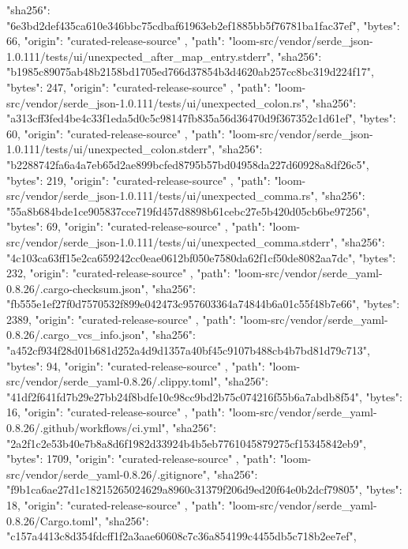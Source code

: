 {{      "sha256": "6e3bd2def435ca610e346bbc75cdbaf61963eb2ef1885bb5f76781ba1fac37ef",
      "bytes": 66,
      "origin": "curated-release-source"
    },
    {
      "path": "loom-src/vendor/serde_json-1.0.111/tests/ui/unexpected_after_map_entry.stderr",
      "sha256": "b1985c89075ab48b2158bd1705ed766d37854b3d4620ab257cc8bc319d224f17",
      "bytes": 247,
      "origin": "curated-release-source"
    },
    {
      "path": "loom-src/vendor/serde_json-1.0.111/tests/ui/unexpected_colon.rs",
      "sha256": "a313cff3fed4be4c33f1eda5d0c5c98147fb835a56d36470d9f367352c1d61ef",
      "bytes": 60,
      "origin": "curated-release-source"
    },
    {
      "path": "loom-src/vendor/serde_json-1.0.111/tests/ui/unexpected_colon.stderr",
      "sha256": "b2288742fa6a4a7eb65d2ae899bcfed8795b57bd04958da227d60928a8df26c5",
      "bytes": 219,
      "origin": "curated-release-source"
    },
    {
      "path": "loom-src/vendor/serde_json-1.0.111/tests/ui/unexpected_comma.rs",
      "sha256": "55a8b684bde1ce905837cce719fd457d8898b61cebc27e5b420d05cb6be97256",
      "bytes": 69,
      "origin": "curated-release-source"
    },
    {
      "path": "loom-src/vendor/serde_json-1.0.111/tests/ui/unexpected_comma.stderr",
      "sha256": "4c103ca63ff15e2ca659242cc0eae0612bf050e7580da62f1cf50de8082aa7dc",
      "bytes": 232,
      "origin": "curated-release-source"
    },
    {
      "path": "loom-src/vendor/serde_yaml-0.8.26/.cargo-checksum.json",
      "sha256": "fb555e1ef27f0d7570532f899e042473c957603364a74844b6a01c55f48b7e66",
      "bytes": 2389,
      "origin": "curated-release-source"
    },
    {
      "path": "loom-src/vendor/serde_yaml-0.8.26/.cargo_vcs_info.json",
      "sha256": "a452cf934f28d01b681d252a4d9d1357a40bf45c9107b488cb4b7bd81d79c713",
      "bytes": 94,
      "origin": "curated-release-source"
    },
    {
      "path": "loom-src/vendor/serde_yaml-0.8.26/.clippy.toml",
      "sha256": "41df2f641fd7b29e27bb24f8bdfe10c98cc9bd2b75c074216f55b6a7abdb8f54",
      "bytes": 16,
      "origin": "curated-release-source"
    },
    {
      "path": "loom-src/vendor/serde_yaml-0.8.26/.github/workflows/ci.yml",
      "sha256": "2a2f1c2e53b40e7b8a8d6f1982d33924b4b5eb7761045879275cf15345842eb9",
      "bytes": 1709,
      "origin": "curated-release-source"
    },
    {
      "path": "loom-src/vendor/serde_yaml-0.8.26/.gitignore",
      "sha256": "f9b1ca6ae27d1c18215265024629a8960c31379f206d9ed20f64e0b2dcf79805",
      "bytes": 18,
      "origin": "curated-release-source"
    },
    {
      "path": "loom-src/vendor/serde_yaml-0.8.26/Cargo.toml",
      "sha256": "c157a4413c8d354fdcff1f2a3aae60608c7c36a854199c4455db5c718b2ee7ef",
}}
